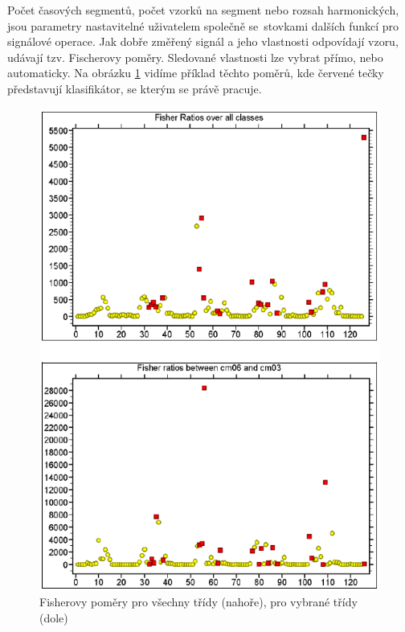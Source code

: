 Počet časových segmentů, počet 
vzorků na segment nebo rozsah harmonických,
jsou parametry nastavitelné uživatelem společně 
se~stovkami dalších funkcí pro signálové operace.
Jak dobře změřený signál a jeho vlastnosti odpovídají
vzoru, udávají tzv. Fischerovy poměry. 
Sledované vlastnosti lze vybrat přímo, nebo 
automaticky. Na obrázku \ref{fig:vallen_fisherovy_vzorce}
vidíme příklad těchto poměrů, kde červené tečky
představují klasifikátor, se kterým se právě pracuje.
\begin{figure}[!h]
    \centering
    \includegraphics[width=0.75\linewidth]{obrazky/visual_class_fisher_ratios.png}
    \caption{Fisherovy poměry pro všechny třídy (nahoře), pro vybrané třídy (dole) \cite{vallen_visual_class}}
    \label{fig:vallen_fisherovy_vzorce}
\end{figure}

